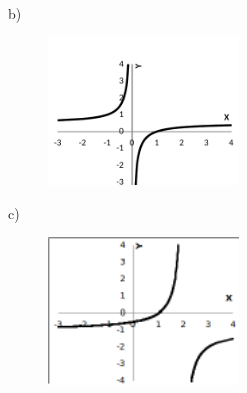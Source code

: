 \begin{respostas}{3}
	~~

	b)

	\begin{figure}[H]
		\begin{center}
			\includegraphics[width=0.45\textwidth]{capitulos/outras_funcoes/media/image58.pdf}
		\end{center}
	\end{figure}

	c)
	
	\begin{figure}[H]
		\begin{center}	
			\includegraphics[width=0.45\textwidth]{capitulos/outras_funcoes/media/image59.pdf}
		\end{center}
	\end{figure}

\end{respostas}

